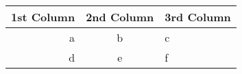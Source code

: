 \documentclass{beamer}
\begin{document}
	\begin{tabular}{r|c|l}
	1st Column & 2nd Column & 3rd Column\\
	\hline
	a & b & c\\
	\cline{2-3}
	d & e & f\\
\end{tabular}
\end{document}
